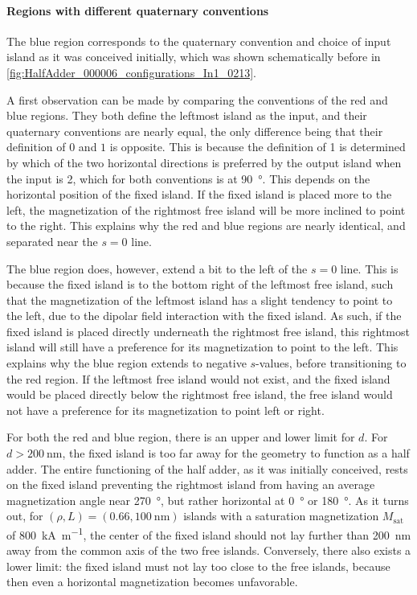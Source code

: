 \documentclass[11pt,a4paper,english,twoside]{article}
\begin{document}
\paragraph{Regions with different quaternary conventions}
The blue region corresponds to the quaternary convention and choice of input island as it was conceived initially, which was shown schematically before in \cref{fig:HalfAdder_000006_configurations_In1_0213}. \par
A first observation can be made by comparing the conventions of the red and blue regions. They both define the leftmost island as the input, and their quaternary conventions are nearly equal, the only difference being that their definition of $0$ and $1$ is opposite. This is because the definition of 1 is determined by which of the two horizontal directions is preferred by the output island when the input is 2, which for both conventions is at \SI{90}{\degree}. This depends on the horizontal position of the fixed island. If the fixed island is placed more to the left, the magnetization of the rightmost free island will be more inclined to point to the right. This explains why the red and blue regions are nearly identical, and separated near the $s=0$ line. \par
The blue region does, however, extend a bit to the left of the $s=0$ line. This is because the fixed island is to the bottom right of the leftmost free island, such that the magnetization of the leftmost island has a slight tendency to point to the left, due to the dipolar field interaction with the fixed island. As such, if the fixed island is placed directly underneath the rightmost free island, this rightmost island will still have a preference for its magnetization to point to the left. This explains why the blue region extends to negative $s$-values, before transitioning to the red region. If the leftmost free island would not exist, and the fixed island would be placed directly below the rightmost free island, the free island would not have a preference for its magnetization to point left or right. \par
For both the red and blue region, there is an upper and lower limit for $d$. For $d>\SI{200}{\nano\metre}$, the fixed island is too far away for the geometry to function as a half adder. The entire functioning of the half adder, as it was initially conceived, rests on the fixed island preventing the rightmost island from having an average magnetization angle near \SI{270}{\degree}, but rather horizontal at \SI{0}{\degree} or \SI{180}{\degree}. As it turns out, for $(\rho, L) = (0.66,\SI{100}{\nano\metre})$ islands with a saturation magnetization $M_\mathrm{sat}$ of \SI{800}{\kilo\ampere\per\metre}, the center of the fixed island should not lay further than \SI{200}{\nano\metre} away from the common axis of the two free islands. Conversely, there also exists a lower limit: the fixed island must not lay too close to the free islands, because then even a horizontal magnetization becomes unfavorable. \par
\end{document}
